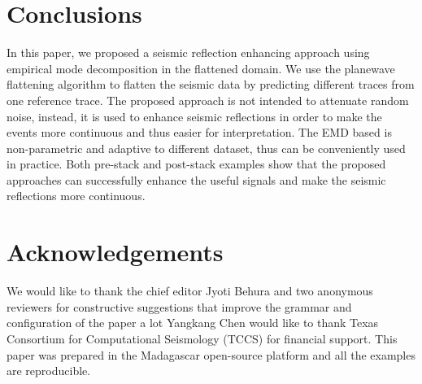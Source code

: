 \section{Conclusions}
In this paper, we proposed a seismic reflection enhancing approach using  empirical mode decomposition  in the flattened domain. We use the plane\new{-}wave flattening algorithm to flatten the seismic data by predicting different traces from one reference trace.  The proposed approach is not intended to attenuate random noise, instead, it is used to enhance seismic reflections in order to make the events more continuous and thus easier for interpretation. The EMD based  is non-parametric and adaptive to different dataset, thus can be conveniently used in practice. Both pre-stack and post-stack examples show that the proposed approaches can successfully enhance the useful signals and make the seismic reflections more continuous. 

\section{Acknowledgements}
We would like to thank the chief editor Jyoti Behura and two anonymous reviewers for  constructive suggestions that improve the grammar and configuration of the paper a lot Yangkang Chen would like to thank Texas Consortium for Computational Seismology (TCCS) for financial support. This paper was prepared in the Madagascar open-source platform \cite[]{mada2013} and all the examples are reproducible.




